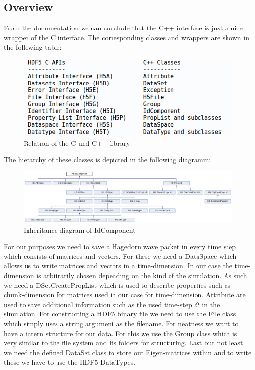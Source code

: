 \documentclass{article}
\begin{document}
\subsection{Overview}
From the documentation we can conclude that the C++ interface is just a nice wrapper of the C interface. The corresponding classes and wrappers are shown in the following table:
\begin{figure}[!h]
\includegraphics[width=1.2\textwidth]{c_vs_cpp.png}
\caption{Relation of the C und C++ library}
\end{figure}
The hierarchy of these classes is depicted in the following diagramm:
\begin{figure}[!h]
\includegraphics[width=1.2\textwidth]{inheritance_diagramm.png}
\caption{Inheritance diagram of IdComponent}
\end{figure}
For our purposes we need to save a Hagedorn wave packet in every time step which consists of matrices and vectors. For these we need a DataSpace which allows us to write matrices and vectors in a time-dimension. In our case the time-dimension is arbitrarily chosen depending on the kind of the simulation. As such we need a DSetCreatePropList which is used to describe properties such as chunk-dimension for matrices used in our case for time-dimension. Attribute are used to save additional information such as the used time-step $\delta t$ in the simulation. For constructing a HDF5 binary file we need to use the File class which simply uses a string argument as the filename. For neatness we want to have a intern structure for our data. For this we use the Group class which is very similar to the file system and its folders for structuring. Last but not least we need the defined DataSet class to store our Eigen-matrices within and to write these we have to use the HDF5 DataTypes.
\end{document}
